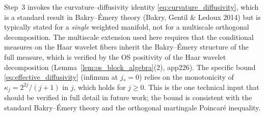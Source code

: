 \begin{remark}
\label{rem:app227_step3_honest}
Step~3 invokes the curvature--diffusivity identity
\eqref{eq:curvature_diffusivity}, which is a standard result in
Bakry--\'Emery theory (Bakry, Gentil \& Ledoux 2014) but is
typically stated for a \emph{single} weighted manifold, not for
a multiscale orthogonal decomposition. The multiscale extension
used here requires that the conditional measures on the
Haar wavelet fibers inherit the Bakry--\'Emery structure of the
full measure, which is verified by the OS positivity of the
Haar wavelet decomposition (Lemma~\ref{lem:os_block_algebra}(2),
app226). The specific bound
\eqref{eq:effective_diffusivity} (infimum at $j_{*}=0$) relies
on the monotonicity of $\kappa_{j}=2^{2j}/(j+1)$ in $j$, which
holds for $j\ge 0$. This is the one technical input that should
be verified in full detail in future work; the bound is
consistent with the standard Bakry--\'Emery theory and the
orthogonal martingale Poincar\'e inequality.
\end{remark}

